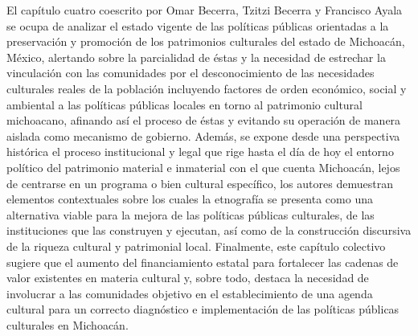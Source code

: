 \documentclass[
  spanish,
  11.5pt,
  170mm x 240mmpaper,
]{scrbook}
\begin{document}
El capítulo cuatro coescrito por Omar Becerra, Tzitzi Becerra y
Francisco Ayala se ocupa de analizar el estado vigente de las políticas
públicas orientadas a la preservación y promoción de los patrimonios
culturales del estado de Michoacán, México, alertando sobre la
parcialidad de éstas y la necesidad de estrechar la vinculación con las
comunidades por el desconocimiento de las necesidades culturales reales
de la población incluyendo factores de orden económico, social y
ambiental a las políticas públicas locales en torno al patrimonio
cultural michoacano, afinando así el proceso de éstas y evitando su
operación de manera aislada como mecanismo de gobierno. Además, se
expone desde una perspectiva histórica el proceso institucional y legal
que rige hasta el día de hoy el entorno político del patrimonio material
e inmaterial con el que cuenta Michoacán, lejos de centrarse en un
programa o bien cultural específico, los autores demuestran elementos
contextuales sobre los cuales la etnografía se presenta como una
alternativa viable para la mejora de las políticas públicas culturales,
de las instituciones que las construyen y ejecutan, así como de la
construcción discursiva de la riqueza cultural y patrimonial local.
Finalmente, este capítulo colectivo sugiere que el aumento del
financiamiento estatal para fortalecer las cadenas de valor existentes
en materia cultural y, sobre todo, destaca la necesidad de involucrar a
las comunidades objetivo en el establecimiento de una agenda cultural
para un correcto diagnóstico e implementación de las políticas públicas
culturales en Michoacán.
\end{document}

